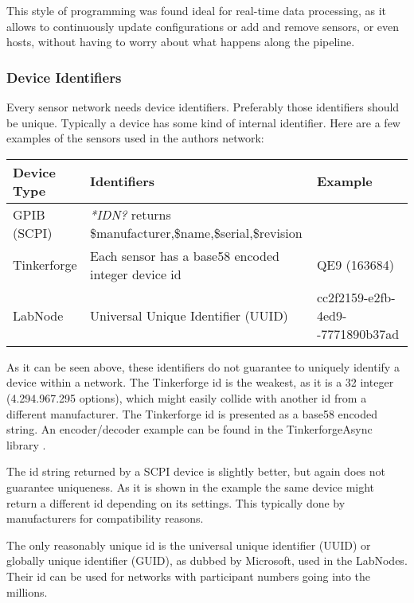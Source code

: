 This style of programming was found ideal for real-time data processing, as it allows to continuously update configurations or add and remove sensors, or even hosts, without having to worry about what happens along the pipeline.

\subsubsection{Device Identifiers}
Every sensor network needs device identifiers. Preferably those identifiers should be unique. Typically a device has some kind of internal identifier. Here are a few examples of the sensors used in the authors network:

\begin{table}[ht]
\centering
\begin{tabularx}{0.95\textwidth}{|l|p{6.5cm}|X|}
    \hline
    Device Type& Identifiers& Example\\
    \hline
    GPIB (SCPI)& \textit{*IDN?} returns \newline \$manufacturer,\$name,\$serial,\$revision& \\
    \hline
    Tinkerforge& Each sensor has a base58 encoded integer device id& QE9 (163684)\\
    \hline
    LabNode& Universal Unique Identifier (UUID) & cc2f2159-e2fb-4ed9-\newline8021-7771890b37ad\\
    \hline
\end{tabularx}
\end{table}

As it can be seen above, these identifiers do not guarantee to uniquely identify a device within a network. The Tinkerforge id is the weakest, as it is a \qty{32}{\bit} integer (4.294.967.295 options), which might easily collide with another id from a different manufacturer. The Tinkerforge id is presented as a base58 encoded string. An encoder/decoder example can be found in the TinkerforgeAsync library \cite{TinkerforgeAsync}.

The id string returned by a SCPI device is slightly better, but again does not guarantee uniqueness. As it is shown in the example the same device might return a different id depending on its settings. This typically done by manufacturers for compatibility reasons.

The only reasonably unique id is the universal unique identifier (UUID) or globally unique identifier (GUID), as dubbed by Microsoft, used in the LabNodes. Their id can be used for networks with participant numbers going into the millions.

